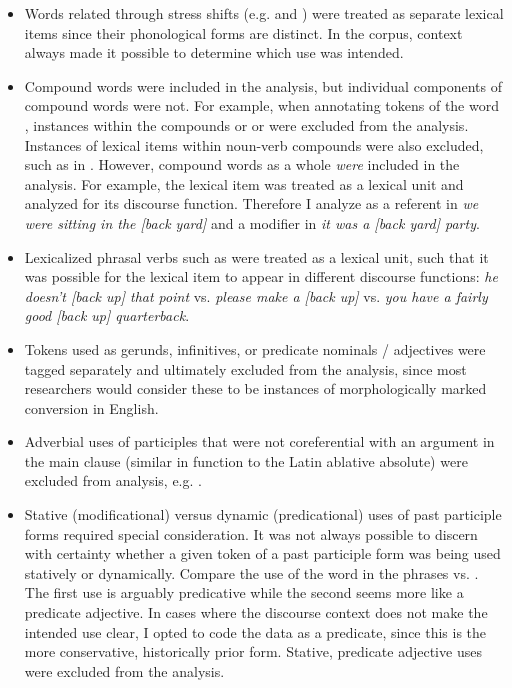 \begin{itemize}

  \singlespacing

  \item Words related through stress shifts (e.g.  and ) were treated as separate lexical items since their phonological forms are distinct. In the corpus, context always made it possible to determine which use was intended.

  \item Compound words were included in the analysis, but individual components of compound words were not. For example, when annotating tokens of the word , instances within the compounds  or  or  were excluded from the analysis. Instances of lexical items within noun-verb compounds  were also excluded, such as  in . However, compound words as a whole \emph{were} included in the analysis. For example, the lexical item  was treated as a lexical unit and analyzed for its discourse function. Therefore I analyze  as a referent in \textit{we were sitting in the [back yard]} and a modifier in \textit{it was a [back yard] party}.

  \item Lexicalized phrasal verbs such as  were treated as a lexical unit, such that it was possible for the lexical item to appear in different discourse functions: \textit{he doesn't [back up] that point} vs. \textit{please make a [back up]} vs. \textit{you have a fairly good [back up] quarterback}.

  \item Tokens used as gerunds, infinitives, or predicate nominals / adjectives were tagged separately and ultimately excluded from the analysis, since most researchers would consider these to be instances of morphologically marked conversion in English.

  \item Adverbial uses of participles that were not coreferential with an argument in the main clause (similar in function to the Latin ablative absolute) were excluded from analysis, e.g. .

  \item Stative (modificational) versus dynamic (predicational) uses of past participle forms required special consideration. It was not always possible to discern with certainty whether a given token of a past participle form was being used statively or dynamically. Compare the use of the word  in the phrases  vs. . The first use is arguably predicative while the second seems more like a predicate adjective. In cases where the discourse context does not make the intended use clear, I opted to code the data as a predicate, since this is the more conservative, historically prior form. Stative, predicate adjective uses were excluded from the analysis.

\end{itemize}

